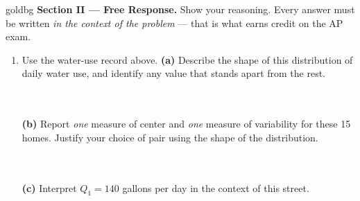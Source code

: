 \documentclass[12pt]{article}
\begin{document}
\boxguard[16]
\begin{headlinebox}{goldbg}
\small
\textbf{Section II --- Free Response.} Show your reasoning. Every answer must be written
\emph{in the context of the problem} --- that is what earns credit on the AP exam.
\end{headlinebox}

\vspace{0.10in}

\begin{enumerate}[leftmargin=1.9em, itemsep=0.12in, resume]

  \item Use the water-use record above. \textbf{(a)} Describe the shape of this distribution of
        daily water use, and identify any value that stands apart from the rest.\\[4pt]
        \\[1pt]
        \\

        \boxguard[17]
        \vspace{4pt}
        \textbf{(b)} Report \emph{one} measure of center and \emph{one} measure of variability
        for these 15 homes. Justify your choice of pair using the shape of the distribution.\\[4pt]
        \\[1pt]
        \\

        \boxguard[17]
        \vspace{4pt}
        \textbf{(c)} Interpret $Q_1 = 140$ gallons per day in the context of this street.\\[4pt]
        \\[1pt]
        \\


\end{enumerate}
\end{document}
